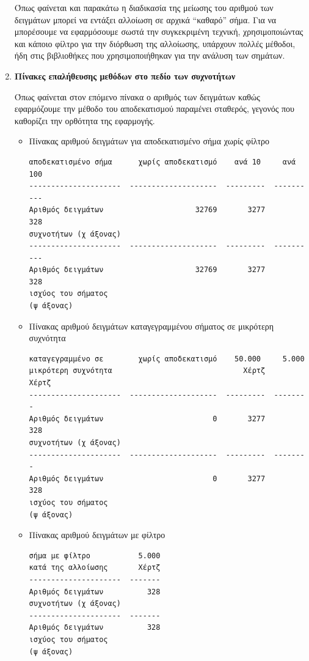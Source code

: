 \documentclass[breaklines=true, 12pt]{article}
\begin{document}
\begin{enumerate}
Όπως φαίνεται και παρακάτω η διαδικασία της μείωσης του αριθμού των
δειγμάτων μπορεί να εντάξει αλλοίωση σε αρχικά “καθαρό” σήμα. Για να
μπορέσουμε να εφαρμόσουμε σωστά την συγκεκριμένη τεχνική, χρησιμοποιώντας
και κάποιο φίλτρο για την διόρθωση της αλλοίωσης, υπάρχουν πολλές μέθοδοι,
ήδη στις βιβλιοθήκες που χρησιμοποιήθηκαν για την ανάλυση των σημάτων.
\clearpage
\item \textbf{Πίνακες επαλήθευσης μεθόδων στο πεδίο των συχνοτήτων}
\label{sec:org466515d}

Όπως φαίνεται στον επόμενο πίνακα ο αριθμός των δειγμάτων καθώς
εφαρμόζουμε την μέθοδο του αποδεκατισμού παραμένει σταθερός, γεγονός που
καθορίζει την ορθότητα της εφαρμογής.
\begin{itemize}
\item Πίνακας αριθμού δειγμάτων για αποδεκατισμένο σήμα χωρίς φίλτρο
\begin{verbatim}
αποδεκατισμένο σήμα      χωρίς αποδεκατισμό    ανά 10     ανά 100
---------------------  --------------------  ---------  ----------
Αριθμός δειγμάτων                     32769       3277         328
συχνοτήτων (χ άξονας)
---------------------  --------------------  ---------  ----------
Αριθμός δειγμάτων                     32769       3277         328
ισχύος του σήματος
(ψ άξονας)
\end{verbatim}
\item Πίνακας αριθμού δειγμάτων καταγεγραμμένου σήματος σε μικρότερη συχνότητα
\begin{verbatim}
καταγεγραμμένο σε        χωρίς αποδεκατισμό    50.000     5.000
μικρότερη συχνότητα                              Χέρτζ     Χέρτζ
---------------------  --------------------  ---------  --------
Αριθμός δειγμάτων                         0       3277       328
συχνοτήτων (χ άξονας)
---------------------  --------------------  ---------  --------
Αριθμός δειγμάτων                         0       3277       328
ισχύος του σήματος
(ψ άξονας)
\end{verbatim}
\item Πίνακας αριθμού δειγμάτων με φίλτρο
\begin{verbatim}
σήμα με φίλτρο           5.000
κατά της αλλοίωσης       Χέρτζ
---------------------  -------
Αριθμός δειγμάτων          328
συχνοτήτων (χ άξονας)
---------------------  -------
Αριθμός δειγμάτων          328
ισχύος του σήματος
(ψ άξονας)
\end{verbatim}
\end{itemize}
\clearpage
\begin{itemize}

\end{itemize}
\end{enumerate}
\end{document}
